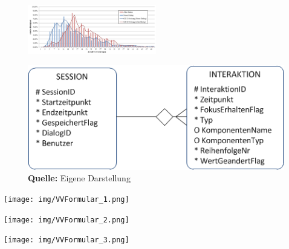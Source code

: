 \label{sec:verteilungVeraenderungen}
\begin{figure}[H]
    \begin{minipage}[H]{1\textwidth} %
        \centering
        \includegraphics[angle=90, width=0.5\textwidth]{img/Verteilung_Veraenderungen}
        \label{fig:verteilungVeraenderungen}
    \end{minipage}
\end{figure}

\label{sec:ermUIDataCollector}
\begin{figure}[H]
    \begin{minipage}[H]{1\textwidth}
        \centering
        \includegraphics[width=.8\textwidth]{img/ERM_UIDataCollector}
        \caption*{\textbf{Quelle:} Eigene Darstellung}
        \label{fig:ermUIDataCollector}
    \end{minipage}
\end{figure}


\label{sec:beispielVermoegensverzeichnisFormular}
\begin{minipage}{\textwidth}
  \centering
  \texttt{[image: img/VVFormular\_1.png]}
\end{minipage}

\bigskip\noindent
\begin{minipage}{\textwidth}
  \centering
  \texttt{[image: img/VVFormular\_2.png]}
\end{minipage}

\bigskip\noindent
\begin{minipage}{\textwidth}
  \centering
  \texttt{[image: img/VVFormular\_3.png]}
\end{minipage}

